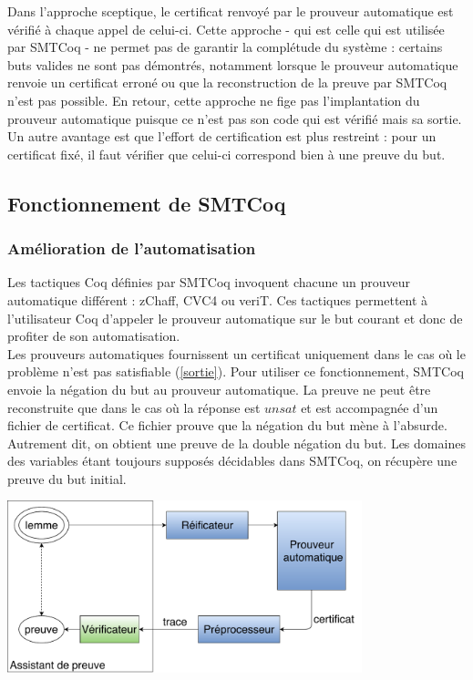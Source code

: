 \documentclass[11pt]{article}
\begin{document}
Dans l'approche sceptique, le certificat renvoyé par le prouveur automatique est vérifié à chaque appel de celui-ci. Cette approche - qui est celle qui est utilisée par SMTCoq - ne permet pas de garantir la complétude du système : certains buts valides ne sont pas démontrés, notamment lorsque le prouveur automatique renvoie un certificat erroné ou que la reconstruction de la preuve par SMTCoq n'est pas possible. En retour, cette approche ne fige pas l'implantation du prouveur automatique puisque ce n'est pas son code qui est vérifié mais sa sortie. Un autre avantage est que l'effort de certification est plus restreint : pour un certificat fixé, il faut vérifier que celui-ci correspond bien à une preuve du but.

\subsection{Fonctionnement de SMTCoq}

\subsubsection{Amélioration de l'automatisation}\label{negation}

Les tactiques Coq définies par SMTCoq invoquent chacune un prouveur automatique différent : zChaff, CVC4 ou veriT. Ces tactiques permettent à l'utilisateur Coq d'appeler le prouveur automatique sur le but courant et donc de profiter de son automatisation. \\

Les prouveurs automatiques fournissent un certificat uniquement dans le cas où le problème n'est pas satisfiable (\ref{sortie}). Pour utiliser ce fonctionnement, SMTCoq envoie la négation du but au prouveur automatique. La preuve ne peut être reconstruite que dans le cas où la réponse est $unsat$ et est accompagnée d'un fichier de certificat. Ce fichier prouve que la négation du but mène à l'absurde. Autrement dit, on obtient une preuve de la double négation du but. Les domaines des variables étant toujours supposés décidables dans SMTCoq, on récupère une preuve du but initial.

\begin{center}
    \includegraphics[height=5cm]{Automatisation.pdf}
\end{center}
\end{document}
